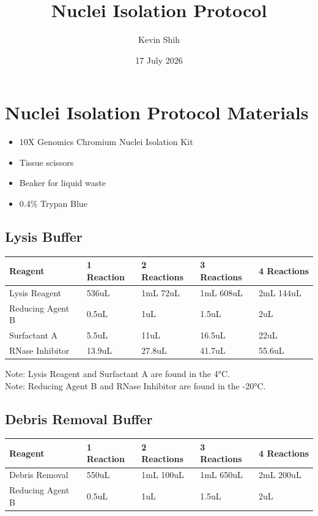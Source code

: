 \documentclass[
]{article}
\title{Nuclei Isolation Protocol}
\author{Kevin Shih}
\date{17 July 2026}
\newcounter{none} %
\providecommand{\tightlist}{%
  \setlength{\itemsep}{0pt}\setlength{\parskip}{0pt}}
\begin{document}
\maketitle

{
\setcounter{tocdepth}{5}
\tableofcontents
}
\section{Nuclei Isolation Protocol
Materials}\label{nuclei-isolation-protocol-materials}

\begin{itemize}
\tightlist
\item
  10X Genomics Chromium Nuclei Isolation Kit
\item
  Tissue scissors
\item
  Beaker for liquid waste
\item
  0.4\% Trypan Blue
\end{itemize}

\subsection{Lysis Buffer}\label{lysis-buffer}

{\def\LTcaptype{none} %
\begin{longtable}[]{@{}lllll@{}}
\toprule\noalign{}
Reagent & 1 Reaction & 2 Reactions & 3 Reactions & 4 Reactions \\
\midrule\noalign{}
\endhead
\bottomrule\noalign{}
\endlastfoot
Lysis Reagent & 536uL & 1mL 72uL & 1mL 608uL & 2mL 144uL \\
Reducing Agent B & 0.5uL & 1uL & 1.5uL & 2uL \\
Surfactant A & 5.5uL & 11uL & 16.5uL & 22uL \\
RNase Inhibitor & 13.9uL & 27.8uL & 41.7uL & 55.6uL \\
\end{longtable}
}

Note: Lysis Reagent and Surfactant A are found in the 4°C.\\
Note: Reducing Agent B and RNase Inhibitor are found in the -20°C.

\subsection{Debris Removal Buffer}\label{debris-removal-buffer}

{\def\LTcaptype{none} %
\begin{longtable}[]{@{}lllll@{}}
\toprule\noalign{}
Reagent & 1 Reaction & 2 Reactions & 3 Reactions & 4 Reactions \\
\midrule\noalign{}
\endhead
\bottomrule\noalign{}
\endlastfoot
Debris Removal & 550uL & 1mL 100uL & 1mL 650uL & 2mL 200uL \\
Reducing Agent B & 0.5uL & 1uL & 1.5uL & 2uL \\
\end{longtable}
}
\end{document}
